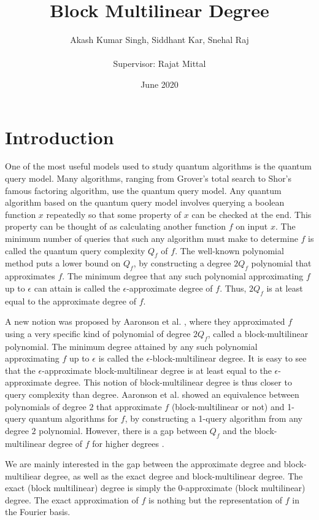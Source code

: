 \documentclass[12pt]{report}
\title{Block Multilinear Degree}
\author{Akash Kumar Singh, Siddhant Kar, Snehal Raj\\\\Supervisor: Rajat Mittal}
\date{June 2020}
\begin{document}
\maketitle

\chapter*{Introduction}
One of the most useful models used to study quantum algorithms is the quantum query model. Many algorithms, ranging from Grover's total search to Shor's famous factoring algorithm, use the quantum query model. Any quantum algorithm based on the quantum query model involves querying a boolean function $x$ repeatedly so that some property of $x$ can be checked at the end. This property can be thought of as calculating another function $f$ on input $x$. The minimum number of queries that such any algorithm must make to determine $f$ is called the quantum query complexity $Q_f$ of $f$. The well-known polynomial method puts a lower bound on $Q_f$, by constructing a degree $2Q_f$ polynomial that approximates $f$. The minimum degree that any such polynomial approximating $f$ up to $\epsilon$ can attain is called the $\epsilon$-approximate degree of $f$. Thus, $2Q_f$ is at least equal to the approximate degree of $f$.

A new notion was proposed by Aaronson et al. \cite{paper1}, where they approximated $f$ using a very specific kind of polynomial of degree $2Q_f$, called a block-multilinear polynomial. The minimum degree attained by any such polynomial approximating $f$ up to $\epsilon$ is called the $\epsilon$-block-multilinear degree. It is easy to see that the $\epsilon$-approximate block-multilinear degree is at least equal to the $\epsilon$-approximate degree. This notion of block-multilinear degree is thus closer to query complexity than degree. Aaronson et al. \cite{paper2} showed an equivalence between polynomials of degree $2$ that approximate $f$ (block-multilinear or not) and 1-query quantum algorithms for $f$, by constructing a 1-query algorithm from any degree $2$ polynomial. However, there is a gap between $Q_f$ and the block-multilinear degree of $f$ for higher degrees \cite{paper2}.

We are mainly interested in the gap between the approximate degree and block-multiliear degree, as well as the exact degree and block-multilinear degree. The exact (block multilinear) degree is simply the 0-approximate (block multilinear) degree. The exact approximation of $f$ is nothing but the representation of $f$ in the Fourier basis.
\end{document}
